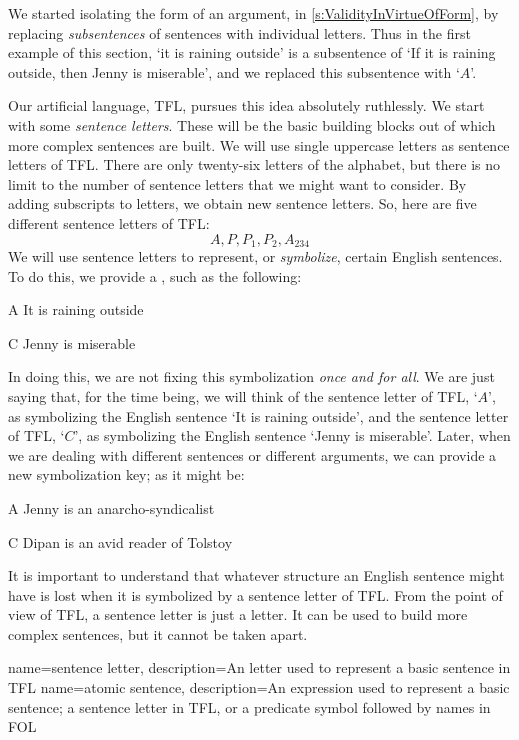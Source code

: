 We started isolating the form of an argument, in \cref{s:ValidityInVirtueOfForm}, by replacing  \emph{subsentences} of sentences with individual letters. Thus in the first example of this section, `it is raining outside' is a subsentence of `If it is raining outside, then Jenny is miserable', and we replaced this subsentence with `$A$'.

Our artificial language, TFL, pursues this idea absolutely ruthlessly. We start with some \emph{sentence letters}. These will be the basic building blocks out of which more complex sentences are built. We will use single uppercase letters as sentence letters of TFL. There are only twenty-six letters of the alphabet, but there is no limit to the number of sentence letters that we might want to consider. By adding subscripts to letters, we obtain new sentence letters. So, here are five different sentence letters of TFL:
	$$A, P, P_1, P_2, A_{234}$$
We will use sentence letters to represent, or \emph{symbolize}, certain English sentences. To do this, we provide a , such as the following:
	\begin{ekey}
		\item[A] It is raining outside
		\item[C] Jenny is miserable
	\end{ekey}
In doing this, we are not fixing this symbolization \emph{once and for all}. We are just saying that, for the time being, we will think of the sentence letter of TFL, `$A$', as symbolizing the English sentence `It is raining outside', and the sentence letter of TFL, `$C$', as symbolizing the English sentence `Jenny is miserable'. Later, when we are dealing with different sentences or different arguments, we can provide a new symbolization key; as it might be:
	\begin{ekey}
		\item[A] Jenny is an anarcho-syndicalist
		\item[C] Dipan is an avid reader of Tolstoy
	\end{ekey}
It is important to understand that whatever structure an English sentence might have is lost when it is symbolized by a sentence letter of TFL. From the point of view of TFL, a sentence letter is just a letter. It can be used to build more complex sentences, but it cannot be taken apart.

{
name=sentence letter,
description={An letter used to represent a basic sentence in TFL}
}
{
name=atomic sentence,
description={An expression used to represent a basic sentence; a sentence letter in TFL, or a predicate symbol followed by names in FOL}
}

